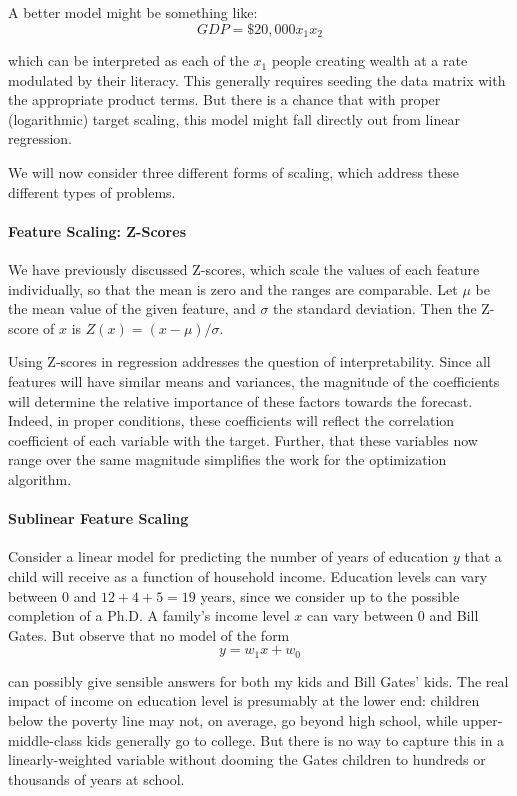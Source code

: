 \documentclass[10pt]{article}
\begin{document}
A better model might be something like:
\[ GDP=\$ 20,000 x_{1} x_{2} \]

which can be interpreted as each of the $x_{1}$ people creating wealth at a rate modulated by their literacy. This generally requires seeding the data matrix with the appropriate product terms. But there is a chance that with proper (logarithmic) target scaling, this model might fall directly out from linear regression.

We will now consider three different forms of scaling, which address these different types of problems.

\paragraph{Feature Scaling: Z-Scores}
We have previously discussed Z-scores, which scale the values of each feature individually, so that the mean is zero and the ranges are comparable. Let $\mu$ be the mean value of the given feature, and $\sigma$ the standard deviation. Then the Z-score of $x$ is $Z(x)=(x-\mu) / \sigma$.

Using Z-scores in regression addresses the question of interpretability. Since all features will have similar means and variances, the magnitude of the coefficients will determine the relative importance of these factors towards the forecast. Indeed, in proper conditions, these coefficients will reflect the correlation coefficient of each variable with the target. Further, that these variables now range over the same magnitude simplifies the work for the optimization algorithm.

\paragraph{Sublinear Feature Scaling}
Consider a linear model for predicting the number of years of education $y$ that a child will receive as a function of household income. Education levels can vary between 0 and $12+4+5=19$ years, since we consider up to the possible completion of a Ph.D. A family's income level $x$ can vary between 0 and Bill Gates. But observe that no model of the form
\[ y=w_{1} x+w_{0} \]

can possibly give sensible answers for both my kids and Bill Gates' kids. The real impact of income on education level is presumably at the lower end: children below the poverty line may not, on average, go beyond high school, while upper-middle-class kids generally go to college. But there is no way to capture this in a linearly-weighted variable without dooming the Gates children to hundreds or thousands of years at school.
\end{document}
